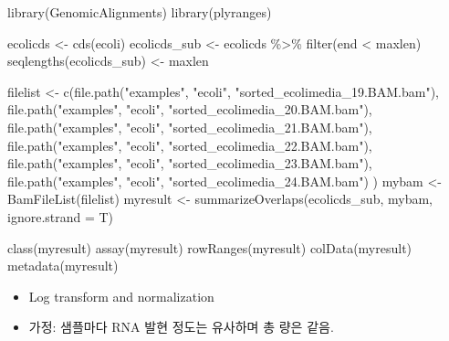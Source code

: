 \documentclass[
]{book}
\newenvironment{Shaded}{\begin{snugshade}}{\end{snugshade}}
\newcommand{\AttributeTok}[1]{\textcolor[rgb]{0.77,0.63,0.00}{#1}}
\newcommand{\FunctionTok}[1]{\textcolor[rgb]{0.00,0.00,0.00}{#1}}
\newcommand{\NormalTok}[1]{#1}
\newcommand{\OtherTok}[1]{\textcolor[rgb]{0.56,0.35,0.01}{#1}}
\newcommand{\SpecialCharTok}[1]{\textcolor[rgb]{0.00,0.00,0.00}{#1}}
\newcommand{\StringTok}[1]{\textcolor[rgb]{0.31,0.60,0.02}{#1}}
\providecommand{\tightlist}{%
  \setlength{\itemsep}{0pt}\setlength{\parskip}{0pt}}
\begin{document}
\begin{Shaded}
\begin{Highlighting}[]
\FunctionTok{library}\NormalTok{(GenomicAlignments)}
\FunctionTok{library}\NormalTok{(plyranges)}

\NormalTok{ecolicds }\OtherTok{\textless{}{-}} \FunctionTok{cds}\NormalTok{(ecoli)}
\NormalTok{ecolicds\_sub }\OtherTok{\textless{}{-}}\NormalTok{ ecolicds }\SpecialCharTok{\%\textgreater{}\%} 
  \FunctionTok{filter}\NormalTok{(end }\SpecialCharTok{\textless{}}\NormalTok{ maxlen)}
\FunctionTok{seqlengths}\NormalTok{(ecolicds\_sub) }\OtherTok{\textless{}{-}}\NormalTok{ maxlen}


\NormalTok{filelist }\OtherTok{\textless{}{-}} \FunctionTok{c}\NormalTok{(}\FunctionTok{file.path}\NormalTok{(}\StringTok{"examples"}\NormalTok{, }\StringTok{"ecoli"}\NormalTok{, }\StringTok{"sorted\_ecolimedia\_19.BAM.bam"}\NormalTok{),}
              \FunctionTok{file.path}\NormalTok{(}\StringTok{"examples"}\NormalTok{, }\StringTok{"ecoli"}\NormalTok{, }\StringTok{"sorted\_ecolimedia\_20.BAM.bam"}\NormalTok{),}
              \FunctionTok{file.path}\NormalTok{(}\StringTok{"examples"}\NormalTok{, }\StringTok{"ecoli"}\NormalTok{, }\StringTok{"sorted\_ecolimedia\_21.BAM.bam"}\NormalTok{),}
              \FunctionTok{file.path}\NormalTok{(}\StringTok{"examples"}\NormalTok{, }\StringTok{"ecoli"}\NormalTok{, }\StringTok{"sorted\_ecolimedia\_22.BAM.bam"}\NormalTok{),}
              \FunctionTok{file.path}\NormalTok{(}\StringTok{"examples"}\NormalTok{, }\StringTok{"ecoli"}\NormalTok{, }\StringTok{"sorted\_ecolimedia\_23.BAM.bam"}\NormalTok{),}
              \FunctionTok{file.path}\NormalTok{(}\StringTok{"examples"}\NormalTok{, }\StringTok{"ecoli"}\NormalTok{, }\StringTok{"sorted\_ecolimedia\_24.BAM.bam"}\NormalTok{)}
\NormalTok{              )}
\NormalTok{mybam }\OtherTok{\textless{}{-}} \FunctionTok{BamFileList}\NormalTok{(filelist)}
\NormalTok{myresult }\OtherTok{\textless{}{-}} \FunctionTok{summarizeOverlaps}\NormalTok{(ecolicds\_sub, mybam, }\AttributeTok{ignore.strand =}\NormalTok{ T)}

\FunctionTok{class}\NormalTok{(myresult)}
\FunctionTok{assay}\NormalTok{(myresult)}
\FunctionTok{rowRanges}\NormalTok{(myresult)}
\FunctionTok{colData}\NormalTok{(myresult)}
\FunctionTok{metadata}\NormalTok{(myresult)}
\end{Highlighting}
\end{Shaded}

\begin{itemize}
\tightlist
\item
  Log transform and normalization
\item
  가정: 샘플마다 RNA 발현 정도는 유사하며 총 량은 같음.
\end{itemize}
\end{document}
